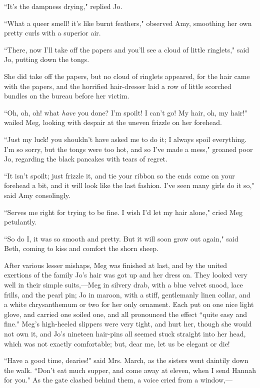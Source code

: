 ``It's the dampness drying," replied Jo.

``What a queer smell! it's like burnt feathers," observed
Amy, smoothing her own pretty curls with a superior air.

``There, now I'll take off the papers and
you'll see a cloud of little ringlets," said Jo, putting
down the tongs.

She did take off the papers, but no cloud of ringlets appeared, for the
hair came with the papers, and the horrified hair-dresser laid a row of
little scorched bundles on the bureau before her victim.

``Oh, oh, oh! what \emph{have} you done? I'm spoilt! I
can't go! My hair, oh, my hair!" wailed Meg, looking
with despair at the uneven frizzle on her forehead.

``Just my luck! you shouldn't have asked me to do it; I
always spoil everything. I'm so sorry, but the tongs
were too hot, and so I've made a mess," groaned poor Jo,
regarding the black pancakes with tears of regret.

``It isn't spoilt; just frizzle it, and tie your ribbon
so the ends come on your forehead a bit, and it will look like the last
fashion. I've seen many girls do it so," said Amy
consolingly.

``Serves me right for trying to be fine. I wish I'd let
my hair alone," cried Meg petulantly.

``So do I, it was so smooth and pretty. But it will soon grow out again,"
said Beth, coming to kiss and comfort the shorn sheep.

After various lesser mishaps, Meg was finished at last, and by the
united exertions of the family Jo's hair was got up and
her dress on. They looked very well in their simple suits,---Meg in
silvery drab, with a blue velvet snood, lace frills, and the pearl pin;
Jo in maroon, with a stiff, gentlemanly linen collar, and a white
chrysanthemum or two for her only ornament. Each put on one nice light
glove, and carried one soiled one, and all pronounced the effect ``quite
easy and fine." Meg's high-heeled slippers were very
tight, and hurt her, though she would not own it, and
Jo's nineteen hair-pins all seemed stuck straight into
her head, which was not exactly comfortable; but, dear me, let us be
elegant or die!

``Have a good time, dearies!" said Mrs. March, as the sisters went
daintily down the walk. ``Don't eat much supper, and come
away at eleven, when I send Hannah for you." As the gate clashed behind
them, a voice cried from a window,---

